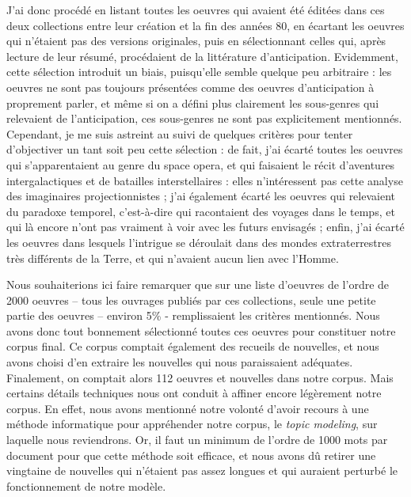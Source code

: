 \documentclass[letterpaper,portrait,12pt]{article}
\begin{document}
{\small 	}J'ai donc proc\'{e}d\'{e} en listant toutes les oeuvres qui avaient \'{e}t\'{e} \'{e}dit\'{e}es dans ces deux collections entre leur cr\'{e}ation et la fin des ann\'{e}es 80, en \'{e}cartant les oeuvres qui n'\'{e}taient pas des versions originales, puis en s\'{e}lectionnant celles qui, apr\`{e}s lecture de leur r\'{e}sum\'{e}, proc\'{e}daient de la litt\'{e}rature d'anticipation. Evidemment, cette s\'{e}lection introduit un biais, puisqu'elle semble quelque peu arbitraire : les oeuvres ne sont pas toujours pr\'{e}sent\'{e}es comme des oeuvres d'anticipation \`{a} proprement parler, et m\^{e}me si on a d\'{e}fini plus clairement les sous-genres qui relevaient de l'anticipation, ces sous-genres ne sont pas explicitement mentionn\'{e}s. Cependant, je me suis astreint au suivi de quelques crit\`{e}res pour tenter d'objectiver un tant soit peu cette s\'{e}lection : de fait, j'ai \'{e}cart\'{e} toutes les oeuvres qui s'apparentaient au genre du space opera, et qui faisaient le r\'{e}cit d'aventures intergalactiques et de batailles interstellaires : elles n'int\'{e}ressent pas cette analyse des imaginaires projectionnistes ; j'ai \'{e}galement \'{e}cart\'{e} les oeuvres qui relevaient du paradoxe temporel, c'est-\`{a}-dire qui racontaient des voyages dans le temps, et qui l\`{a} encore n'ont pas vraiment \`{a} voir avec les futurs envisag\'{e}s ; enfin, j'ai \'{e}cart\'{e} les oeuvres dans lesquels l'intrigue se d\'{e}roulait dans des mondes extraterrestres tr\`{e}s diff\'{e}rents de la Terre, et qui n'avaient aucun lien avec l'Homme. 





	Nous souhaiterions ici faire remarquer que sur une liste d'oeuvres de l'ordre de 2000 oeuvres -- tous les ouvrages publi\'{e}s par ces collections, seule une petite partie des oeuvres -- environ 5\% - remplissaient les crit\`{e}res mentionn\'{e}s. Nous avons donc tout bonnement s\'{e}lectionn\'{e} toutes ces oeuvres pour constituer notre corpus final. Ce corpus comptait \'{e}galement des recueils de nouvelles, et nous avons choisi d'en extraire les nouvelles qui nous paraissaient ad\'{e}quates. Finalement, on comptait alors 112 oeuvres et nouvelles dans notre corpus. Mais certains d\'{e}tails techniques nous ont conduit \`{a} affiner encore l\'{e}g\`{e}rement notre corpus. En effet, nous avons mentionn\'{e} notre volont\'{e} d'avoir recours \`{a} une m\'{e}thode informatique pour appr\'{e}hender notre corpus, le\emph{ topic modeling},\emph{ }sur laquelle nous reviendrons. Or, il faut un minimum de l'ordre de 1000 mots par document pour que cette m\'{e}thode soit efficace, et nous avons d\^{u} retirer une vingtaine de nouvelles qui n'\'{e}taient pas assez longues et qui auraient perturb\'{e} le fonctionnement de notre mod\`{e}le.
\end{document}
